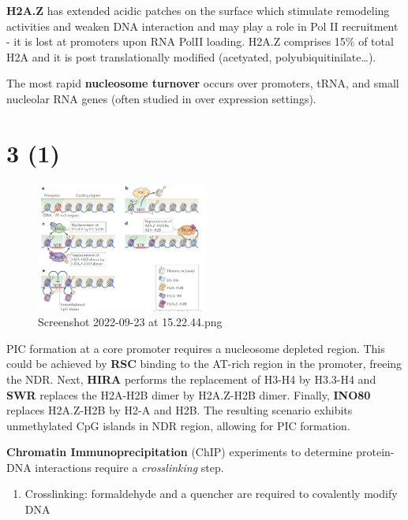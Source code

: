 \textbf{H2A.Z} has extended acidic patches on the surface which stimulate remodeling activities and weaken DNA interaction and may play a role in Pol II recruitment - it is lost at promoters upon RNA PolII loading. H2A.Z comprises 15\% of total H2A and it is post translationally modified (acetyated, polyubiquitinilate\ldots).

The most rapid \textbf{nucleosome turnover} occurs over promoters, tRNA, and small nucleolar RNA genes (often studied in over expression settings).

\hypertarget{section}{%
\section{3 (1)}\label{section}}

\begin{figure}
\centering
\includegraphics[width=0.5\textwidth]{../_resources/Screenshot_2022-09-23_at_15-22-44.png}
\caption{Screenshot 2022-09-23 at 15.22.44.png}
\end{figure}

PIC formation at a core promoter requires a nucleosome depleted region. This could be achieved by \textbf{RSC} binding to the AT-rich region in the promoter, freeing the NDR. Next, \textbf{HIRA} performs the replacement of H3-H4 by H3.3-H4 and \textbf{SWR} replaces the H2A-H2B dimer by H2A.Z-H2B dimer. Finally, \textbf{INO80} replaces H2A.Z-H2B by H2-A and H2B. The resulting scenario exhibits unmethylated CpG islands in NDR region, allowing for PIC formation.

\textbf{Chromatin Immunoprecipitation} (ChIP) experiments to determine protein-DNA interactions require a \emph{crosslinking} step.

\begin{enumerate}
\def\labelenumi{\arabic{enumi}.}
\tightlist
\item
  Crosslinking: formaldehyde and a quencher are required to covalently modify DNA
\end{enumerate}

